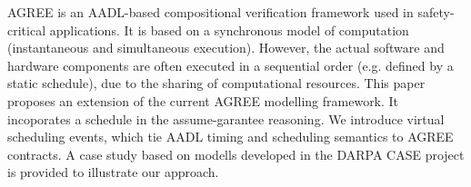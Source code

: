 AGREE is an AADL-based compositional verification framework used in safety-critical applications. It is based on a synchronous model of computation (instantaneous and simultaneous execution). However, the actual software and hardware components are often executed in a sequential order (e.g. defined by a static schedule), due to the sharing of computational resources. This paper proposes an extension of the current AGREE modelling framework.  It  incoporates a schedule in the assume-garantee reasoning. We introduce virtual scheduling events, which tie AADL timing and scheduling semantics to AGREE contracts. A case study based on modells developed in the DARPA CASE project is provided to illustrate our approach.

